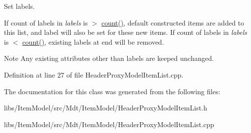 Set labels. 

If count of labels in {\itshape labels} is $>$ \hyperlink{class_mdt_1_1_item_model_1_1_header_proxy_model_item_list_a3c794a9573588cbbdb7f91c7433ceaab}{count()}, default constructed items are added to this list, and label will also be set for these new items. If count of labels in {\itshape labels} is $<$ \hyperlink{class_mdt_1_1_item_model_1_1_header_proxy_model_item_list_a3c794a9573588cbbdb7f91c7433ceaab}{count()}, existing labels at end will be removed.

\begin{DoxyNote}{Note}
Any existing attributes other than labels are keeped unchanged. 
\end{DoxyNote}


Definition at line 27 of file Header\+Proxy\+Model\+Item\+List.\+cpp.



The documentation for this class was generated from the following files\+:\begin{DoxyCompactItemize}
\item 
libs/\+Item\+Model/src/\+Mdt/\+Item\+Model/Header\+Proxy\+Model\+Item\+List.\+h\item 
libs/\+Item\+Model/src/\+Mdt/\+Item\+Model/Header\+Proxy\+Model\+Item\+List.\+cpp\end{DoxyCompactItemize}
